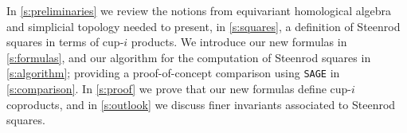 In \cref{s:preliminaries} we review the notions from equivariant homological algebra and simplicial topology needed to present, in \cref{s:squares}, a definition of Steenrod squares in terms of cup-$i$ products.
We introduce our new formulas in \cref{s:formulas}, and our algorithm for the computation of Steenrod squares in \cref{s:algorithm}; providing a proof-of-concept comparison using \verb|SAGE| in \cref{s:comparison}.
In \cref{s:proof} we prove that our new formulas define cup-$i$ coproducts, and in \cref{s:outlook} we discuss finer invariants associated to Steenrod squares.
